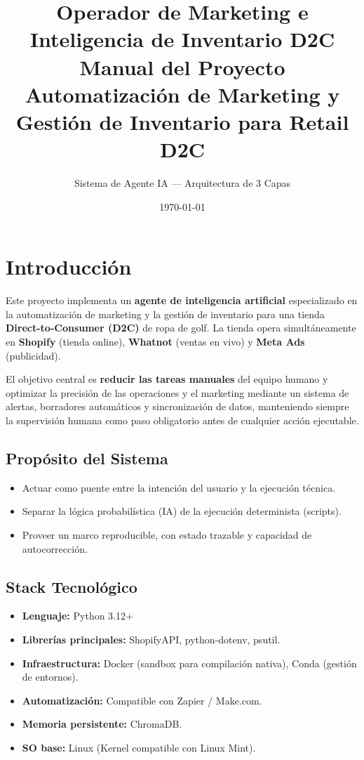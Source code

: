 \documentclass[a4paper,12pt]{article}
\title{\Huge\textbf{Operador de Marketing e\\Inteligencia de Inventario D2C}\\[0.8cm]
\Large Manual del Proyecto\\[0.3cm]
\large Automatización de Marketing y Gestión de Inventario para Retail D2C}
\author{Sistema de Agente IA --- Arquitectura de 3 Capas}
\date{\today}
\begin{document}
\maketitle
\thispagestyle{empty}
\newpage

\tableofcontents
\newpage

\section{Introducción}

Este proyecto implementa un \textbf{agente de inteligencia artificial} especializado en la automatización de marketing y la gestión de inventario para una tienda \textbf{Direct-to-Consumer (D2C)} de ropa de golf. La tienda opera simultáneamente en \textbf{Shopify} (tienda online), \textbf{Whatnot} (ventas en vivo) y \textbf{Meta Ads} (publicidad).

El objetivo central es \textbf{reducir las tareas manuales} del equipo humano y optimizar la precisión de las operaciones y el marketing mediante un sistema de alertas, borradores automáticos y sincronización de datos, manteniendo siempre la supervisión humana como paso obligatorio antes de cualquier acción ejecutable.

\subsection{Propósito del Sistema}

\begin{itemize}
    \item Actuar como puente entre la intención del usuario y la ejecución técnica.
    \item Separar la lógica probabilística (IA) de la ejecución determinista (scripts).
    \item Proveer un marco reproducible, con estado trazable y capacidad de autocorrección.
\end{itemize}

\subsection{Stack Tecnológico}

\begin{itemize}
    \item \textbf{Lenguaje:} Python 3.12+
    \item \textbf{Librerías principales:} ShopifyAPI, python-dotenv, psutil.
    \item \textbf{Infraestructura:} Docker (sandbox para compilación nativa), Conda (gestión de entornos).
    \item \textbf{Automatización:} Compatible con Zapier / Make.com.
    \item \textbf{Memoria persistente:} ChromaDB.
    \item \textbf{SO base:} Linux (Kernel compatible con Linux Mint).
\end{itemize}
\end{document}

